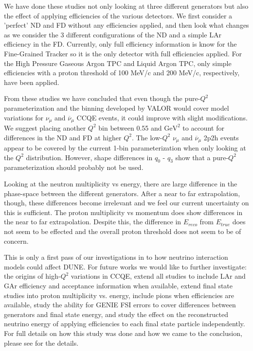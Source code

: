 \documentclass[12pt]{article}
\newcommand{\textapprox}{\raisebox{0.5ex}{\texttildelow}}
\begin{document}
We have done these studies not only looking at three different generators but also the effect of applying efficiencies of the various detectors. 
We first consider a 'perfect' ND and FD without any efficiencies applied, and then look what changes as we consider the 3 different configurations of the ND and a simple LAr efficiency in the FD. 
Currently, only full efficiency information is know for the Fine-Grained Tracker so it is the only detector with full efficiencies applied.  
For the High Pressure Gaseous Argon TPC and Liquid Argon TPC, only simple efficiencies with a proton threshold of 100 MeV/c and 200 MeV/c, respectively, have been applied.

From these studies we have concluded that even though the pure-$Q^2$ parameterization and the binning developed by VALOR would cover model variations for $\nu_{\mu}$ and $\overline{\nu}_{\mu}$ CCQE events, it could improve with slight modifications.
We suggest placing another $Q^2$ bin between 0.55 and \textapprox{1.25} $\textrm{GeV}^2$ to account for differences in the ND and FD at higher $Q^2$. The low-$Q^2$ $\nu_{\mu}$ and $\overline{\nu}_{\mu}$ 2p2h events appear to be covered by the current 1-bin parameterization when only looking at the $Q^2$ distribution. However, shape differences in $q_0 \textrm{ - } q_3$ show that a pure-$Q^2$ parameterization should probably not be used.

Looking at the neutron multiplicity vs energy, there are large difference in the phase-space between the different generators.
After a near to far extrapolation, though, these differences become irrelevant and we feel our current uncertainty on this is sufficient.  
The proton multiplicity vs momentum does show differences in the near to far extrapolation.
Despite this, the difference in $E_{reco}$ from $E_{true}$ does not seem to be effected and the overall proton threshold does not seem to be of concern.  

This is only a first pass of our investigations in to how neutrino interaction models could affect DUNE.
For future works we would like to further investigate: the origins of high-$Q^2$ variations in CCQE, extend all studies to include LAr and GAr efficiency and acceptance information when available, extend final state studies into proton multiplicity vs. energy, include pions when efficiencies are available, study the ability for GENIE FSI errors to cover differences between generators and final state energy, and study the effect on the reconstructed neutrino energy of applying efficiencies to each final state particle independently.  
For full details on how this study was done and how we came to the conclusion, please see \cite{this paper} for the details.
\end{document}
